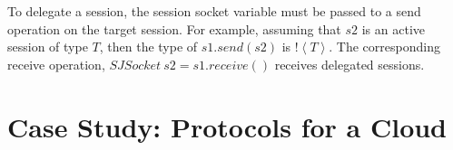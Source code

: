 \documentclass{llncs}
\begin{document}

To delegate a session, the session socket variable must be passed to a send operation on the target session.
For example, assuming that $s2$ is an active session of type $T$, then the type of $s1.\textit{send}(s2)$ is $\mathopen!\left<T\right>$.
The corresponding receive operation, $\textit{SJSocket}~s2 = s1.\textit{receive}()$ receives delegated sessions.

\section{Case Study: Protocols for a Cloud}
\label{sect:impl}
\end{document}
